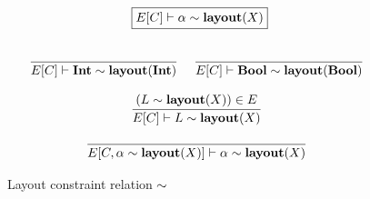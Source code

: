 \begin{figure}
  \[
    \begin{array}{c}
      \fbox{$E[C] \vdash \alpha \isA \layout{X}$}
      \fboxNewlines
      \labinfer{E[C] \vdash \Int \isA \layout{\Int}}{}
      ~~~
      \labinfer{E[C] \vdash \Bool \isA \layout{\Bool}}{}
      \\\\
      \labinfer{E[C] \vdash L \isA \layout{X}}{(L \isA \layout{X}) \in E}
      \\\\
      \labinfer{E[C, \alpha \isA \layout{X}] \vdash \alpha \isA \layout{X}}{}
    \end{array}
  \]
  \caption{Layout constraint relation $\sim$}
  \label{fig:layout-constraints}
\end{figure}

